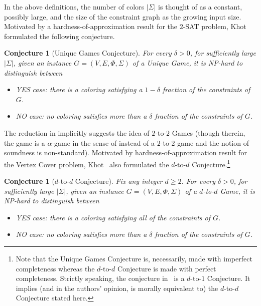 \documentclass[11pt]{article}
\numberwithin{equation}{section}
\theoremstyle{definition}
\theoremstyle{plain}
\newtheorem{rconj}[theorem]{Conjecture}
\begin{document}
In the above definitions, the number of colors $|\Sigma|$ is thought of as a constant,
possibly large, and the
size of the constraint graph as the growing input size.
Motivated by a hardness-of-approximation result for the $2$-SAT problem,
Khot~\cite{Khot02} formulated the %
following conjecture. %

%
%
%
\begin{rconj}[Unique Games Conjecture]\label{conj:ugc}
For every  %
$\delta>0$, for sufficiently large  %
$|\Sigma|$,
given an instance $G=(V,E,\Phi,\Sigma)$ of a Unique Game, it is NP-hard
to distinguish between
\begin{itemize}
\item YES case: there is a coloring satisfying
a %
$1-\delta$ fraction of the constraints of $G$.
\item NO case: no coloring satisfies more than
a %
$\delta$ fraction of the constraints of $G$.
\end{itemize}
\end{rconj}

The reduction in \cite{DS05} implicitly suggests the idea of $2$-to-$2$ Games (though
therein, the game is a $\alpha$-game in the sense
of \cite{DinurMosselRegev} instead of a $2$-to-$2$ game and
the notion of soundness is non-standard). Motivated by hardness-of-approximation result for the Vertex Cover
problem,  Khot~\cite{Khot02} also formulated the $d$-to-$d$ Conjecture.\footnote{Note that the Unique Games Conjecture is, necessarily,
made with imperfect completeness whereas the $d$-to-$d$ Conjecture is made with perfect completeness. Strictly speaking, the conjecture
in~\cite{Khot02} is a $d$-to-$1$ Conjecture. It implies (and in the authors' opinion,
is morally equivalent to) the $d$-to-$d$ Conjecture stated here.}

%
\begin{rconj}[$d$-to-$d$ Conjecture] \label{conj:d-to-d}
Fix any integer $d \geqslant 2$.
For every %
$\delta>0$, for sufficiently large
%
$|\Sigma|$,  given an instance $G=(V,E,\Phi,\Sigma)$ of a $d$-to-$d$ Game, it is NP-hard
to distinguish between
\begin{itemize}
\item YES case: there is a coloring satisfying all of the constraints of $G$.
\item NO case: no coloring satisfies more than
a %
$\delta$ fraction of the constraints of $G$.
\end{itemize}
\end{rconj}
\end{document}
